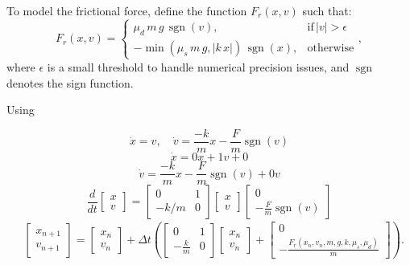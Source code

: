 \documentclass[12pt, a4paper, oneside]{report}
\begin{document}
To model the frictional force, define the function \( F_r(x, v) \) such that:
\[
	F_r(x, v) =
	\begin{cases}
		\mu_d \, m \, g \, \operatorname{sgn}(v),                  & \text{if} \, |v| > \epsilon \\
		-\min(\mu_s \, m \, g, |k \, x|) \, \operatorname{sgn}(x), & \text{otherwise}
	\end{cases},
\]
where \( \epsilon \) is a small threshold to handle numerical precision issues, and \( \operatorname{sgn} \) denotes the sign function.

Using

\[\dot{x}=v, \quad \dot{v}=\frac{-k}{m} x -\frac{F}{m}\operatorname{sgn}(v)\]\[\dot{x} = 0x + 1v + 0\]\[\dot{v}=\frac{-k}{m} x -\frac{F}{m}\operatorname{sgn}(v) + 0v\]$$\frac{d}{d t}\left[\begin{array}{l}x \\v\end{array}\right]=\left[\begin{array}{cc}0 & 1 \\-k / m & 0\end{array}\right]\left[\begin{array}{c}x \\v\end{array}\right]\left[\begin{array}{c}0 \\-\frac{F}{m}\operatorname{sgn}(v)\end{array}\right]$$\[\begin{aligned}& \left[\begin{array}{l}x_{n+1} \\v_{n+1}\end{array}\right]= \left[\begin{array}{l}x_n \\v_n\end{array}\right] + \Delta t \left( \left[\begin{array}{cc}0 & 1 \\-\frac{k}{m} & 0\end{array}\right] \left[\begin{array}{l}x_n \\v_n\end{array}\right] + \left[\begin{array}{c}0 \\-\frac{F_r(x_n, v_n, m, g, k, \mu_s, \mu_d)}{m}\end{array}\right] \right).\end{aligned}\]
\end{document}
